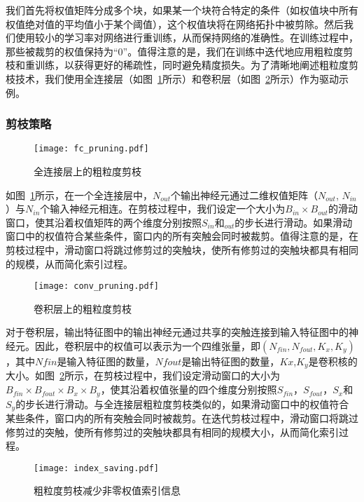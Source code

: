 我们首先将权值矩阵分成多个块，如果某一个块符合特定的条件（如权值块中所有权值绝对值的平均值小于某个阈值），这个权值块将在网络拓扑中被剪除。然后我们使用较小的学习率对网络进行重训练，从而保持网络的准确性。在训练过程中，那些被裁剪的权值保持为“0”。值得注意的是，我们在训练中迭代地应用粗粒度剪枝和重训练，以获得更好的稀疏性，同时避免精度损失。为了清晰地阐述粗粒度剪枝技术，我们使用全连接层（如图~\ref{fig:fc_pruning}所示）和卷积层（如图~\ref{fig:conv_pruning}所示）作为驱动示例。

\subsubsection{剪枝策略}

\begin{figure}[h]
\centering
\texttt{[image: fc\_pruning.pdf]}
\caption{全连接层上的粗粒度剪枝}
\label{fig:fc_pruning}
\end{figure}

如图~\ref{fig:fc_pruning}所示，在一个全连接层中，$N_{out}$个输出神经元通过二维权值矩阵（$N_{out}$, $N_{in}$）与$N_{in}$个输入神经元相连。在剪枝过程中，我们设定一个大小为$B_{in} \times B_{out}$的滑动窗口，使其沿着权值矩阵的两个维度分别按照$S_{in}$和$_{out}$的步长进行滑动。如果滑动窗口中的权值符合某些条件，窗口内的所有突触会同时被裁剪。值得注意的是，在剪枝过程中，滑动窗口将跳过修剪过的突触块，使所有修剪过的突触块都具有相同的规模，从而简化索引过程。

\begin{figure}[h]
  \centering
  \texttt{[image: conv\_pruning.pdf]}
  \caption{卷积层上的粗粒度剪枝}
  \label{fig:conv_pruning}
\end{figure}

对于卷积层，输出特征图中的输出神经元通过共享的突触连接到输入特征图中的神经元。因此，卷积层中的权值可以表示为一个四维张量，即$(N_{fin},N_{fout},K_x,K_y)$，其中$N {fin}$是输入特征图的数量，$N {fout}$是输出特征图的数量，$K x$,$K_y$是卷积核的大小。如图~\ref{fig:conv_pruning}所示，在剪枝过程中，我们设定滑动窗口的大小为$B_{fin} \times B_{fout} \times B_x \times B_y$，使其沿着权值张量的四个维度分别按照$S_{fin}$，$S_{fout}$，$S_x$和$S_y$的步长进行滑动。与全连接层粗粒度剪枝类似的，如果滑动窗口中的权值符合某些条件，窗口内的所有突触会同时被裁剪。在迭代剪枝过程中，滑动窗口将跳过修剪过的突触，使所有修剪过的突触块都具有相同的规模大小，从而简化索引过程。

\begin{figure}[h]
  \centering
  \texttt{[image: index\_saving.pdf]}
  \caption{粗粒度剪枝减少非零权值索引信息}
  \label{fig:index_saving}
\end{figure}

